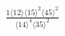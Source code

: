 \documentclass[varwidth, border=5pt]{standalone}
\begin{document}
\begin{my}
$\begin{gathered}
\scriptscriptstyle\frac{1⟨12⟩⟨15⟩^2⟨45⟩^2}{⟨14⟩^4⟨35⟩^2}
\end{gathered}$
\end{my}
\end{document}
